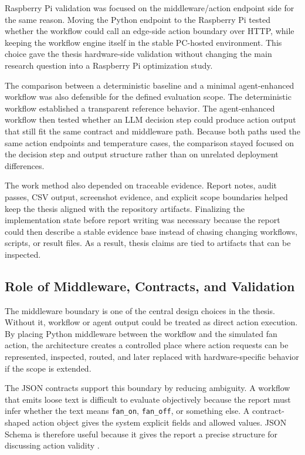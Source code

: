 Raspberry Pi validation was focused on the middleware/action endpoint side for the same reason. Moving the Python endpoint to the Raspberry Pi tested whether the workflow could call an edge-side action boundary over HTTP, while keeping the workflow engine itself in the stable PC-hosted environment. This choice gave the thesis hardware-side validation without changing the main research question into a Raspberry Pi optimization study.

The comparison between a deterministic baseline and a minimal agent-enhanced workflow was also defensible for the defined evaluation scope. The deterministic workflow established a transparent reference behavior. The agent-enhanced workflow then tested whether an LLM decision step could produce action output that still fit the same contract and middleware path. Because both paths used the same action endpoints and temperature cases, the comparison stayed focused on the decision step and output structure rather than on unrelated deployment differences.

The work method also depended on traceable evidence. Report notes, audit passes, CSV output, screenshot evidence, and explicit scope boundaries helped keep the thesis aligned with the repository artifacts. Finalizing the implementation state before report writing was necessary because the report could then describe a stable evidence base instead of chasing changing workflows, scripts, or result files. As a result, thesis claims are tied to artifacts that can be inspected.

\subsection{Role of Middleware, Contracts, and Validation}\label{subsec:discussion-middleware-contracts-validation}

The middleware boundary is one of the central design choices in the thesis. Without it, workflow or agent output could be treated as direct action execution. By placing Python middleware between the workflow and the simulated fan action, the architecture creates a controlled place where action requests can be represented, inspected, routed, and later replaced with hardware-specific behavior if the scope is extended.

The JSON contracts support this boundary by reducing ambiguity. A workflow that emits loose text is difficult to evaluate objectively because the report must infer whether the text means \texttt{fan\_on}, \texttt{fan\_off}, or something else. A contract-shaped action object gives the system explicit fields and allowed values. JSON Schema is therefore useful because it gives the report a precise structure for discussing action validity \cite{jsonSchemaDocs}.

